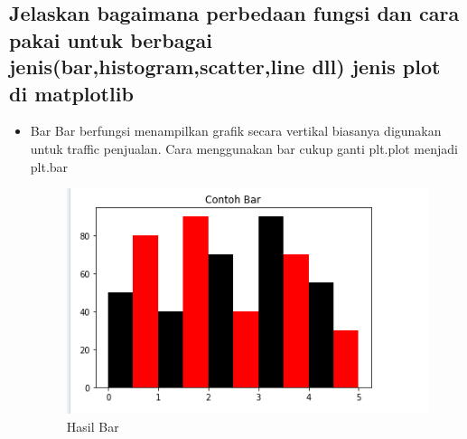 \subsection{Jelaskan bagaimana perbedaan fungsi dan cara pakai untuk berbagai jenis(bar,histogram,scatter,line dll) jenis plot di matplotlib}
\begin{itemize}
    \item Bar\newline
    Bar berfungsi menampilkan grafik secara vertikal biasanya digunakan untuk traffic penjualan.\newline
    Cara menggunakan bar cukup ganti plt.plot menjadi plt.bar

    

\begin{figure}[h]
\centering
\includegraphics[scale=0.3]{figures/6/Teori/1174051/2.png}
\caption{Hasil Bar}
\label{fig:contoh}
\end{figure}
\end{itemize}

